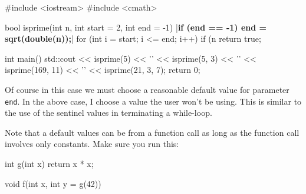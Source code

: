 \begin{consolethree}[escapeinside=||]
#include <iostream>
#include <cmath>

bool isprime(int n, int start = 2, int end = -1)
{
    |\textbf{if (end == -1) end = sqrt(double(n));}|
    for (int i = start; i <= end; i++)
    {
        if (n %
    }
    return true;
}

int main()
{
    std::cout << isprime(5) << '\n'
              << isprime(5, 3) << '\n'
              << isprime(169, 11) << '\n'
              << isprime(21, 3, 7);
    return 0;
}
\end{consolethree}

Of course in this case we must choose a reasonable default value for parameter \texttt{end}. In the above case, I choose a value the user won't be using. This is similar to the use of the sentinel values in terminating a while-loop.

Note that a default values can be from a function call as long as the function call involves only constants. Make sure you run this:

\begin{consolethree}[escapeinside=||]
int g(int x)
{
    return x * x;
}

void f(int x, int y = g(42))
{}
\end{consolethree}


